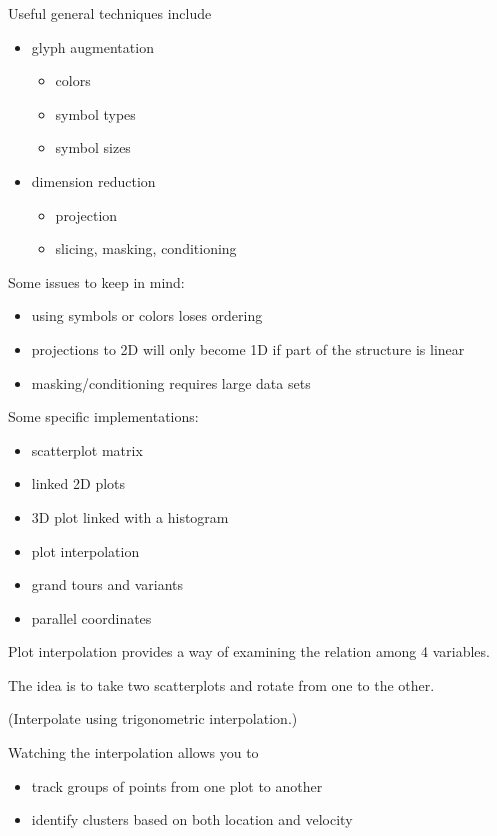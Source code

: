 \begin{slide}{}
Useful general techniques include
\begin{itemize}
\item glyph augmentation
\begin{itemize}
\item colors
\item symbol types
\item symbol sizes
\end{itemize}
\item dimension reduction
\begin{itemize}
\item projection
\item slicing, masking, conditioning
\end{itemize}
\end{itemize}
Some issues to keep in mind:
\begin{itemize}
\item using symbols or colors loses ordering
\item projections to 2D will only become 1D if part of the structure
is linear
\item masking/conditioning requires large data sets
\end{itemize}
\end{slide}

\begin{slide}{}
Some specific implementations:
\begin{itemize}
\item scatterplot matrix
\item linked 2D plots
\item 3D plot linked with a histogram
\item plot interpolation
\item grand tours and variants
\item parallel coordinates
\end{itemize}
\end{slide}

\begin{slide}{}
Plot interpolation provides a way of examining the relation among 4
variables.

The idea is to take two scatterplots and rotate from one to the other.

(Interpolate using trigonometric interpolation.)

Watching the interpolation allows you to 
\begin{itemize}
\item track groups of points from one plot to another
\item identify clusters based on both location and velocity
\end{itemize}
\end{slide}

